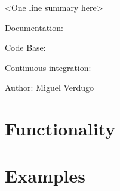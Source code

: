 
<One line summary here>

Documentation:

Code Base:

Continuous integration:

Author: Miguel Verdugo


\section{Functionality%
  \label{functionality}%
}


\section{Examples%
  \label{examples}%
}
